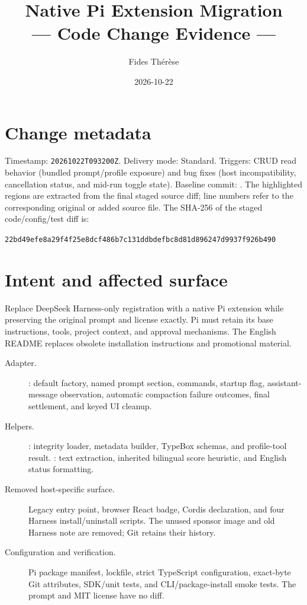 \documentclass[10pt]{ltjsarticle}
\begin{document}
\title{Native Pi Extension Migration\\\large{--- Code Change Evidence ---}}
\author{Fides Thérèse}
\date{2026-10-22}
\maketitle
\thispagestyle{plain}

\section{Change metadata}
Timestamp: \texttt{20261022T093200Z}. Delivery mode: Standard.
Triggers: CRUD read behavior (bundled prompt/profile exposure) and bug fixes
(host incompatibility, cancellation status, and mid-run toggle state).
Baseline commit: .
The highlighted regions are extracted from the final staged source diff;
line numbers refer to the corresponding original or added source file.
The SHA-256 of the staged code/config/test diff is:\par\noindent
\texttt{22bd49efe8a29f4f25e8dcf486b7c131ddbdefbc8d81d896247d9937f926b490}

\section{Intent and affected surface}
Replace DeepSeek Harness-only registration with a native Pi extension while
preserving the original prompt and license exactly. Pi must retain its base
instructions, tools, project context, and approval mechanisms. The English
README replaces obsolete installation instructions and promotional material.

\begin{description}
\item[Adapter.] : default factory, named prompt section,
commands, startup flag, assistant-message observation, automatic compaction
failure outcomes, final settlement, and keyed UI cleanup.
\item[Helpers.] : integrity loader, metadata builder,
TypeBox schemas, and profile-tool result. : text extraction,
inherited bilingual score heuristic, and English status formatting.
\item[Removed host-specific surface.] Legacy entry point, browser React badge,
Cordis declaration, and four Harness install/uninstall scripts. The unused
sponsor image and old Harness note are removed; Git retains their history.
\item[Configuration and verification.] Pi package manifest, lockfile, strict
TypeScript configuration, exact-byte Git attributes, SDK/unit tests, and
CLI/package-install smoke tests. The prompt and MIT license have no diff.
\end{description}
\end{document}
